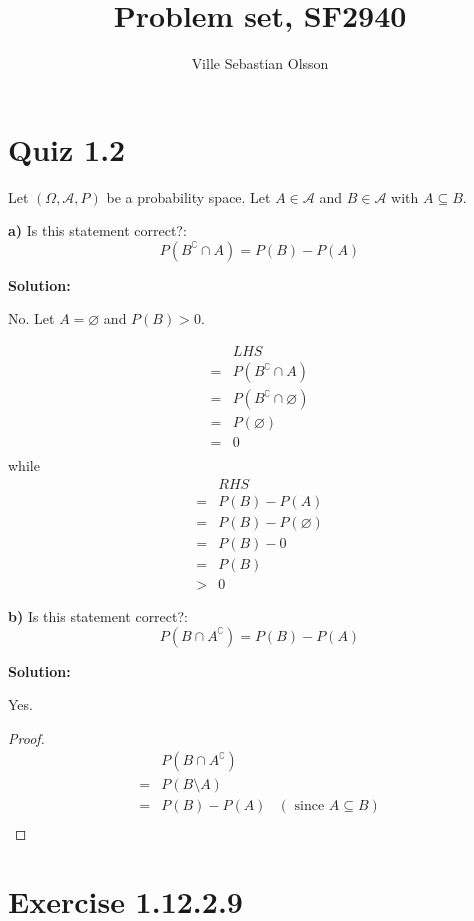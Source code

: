 \documentclass{article}
\title{Problem set, SF2940}
\author{Ville Sebastian Olsson}
\begin{document}
\maketitle

\section{Quiz 1.2}

Let \((\Omega, \mathcal{A}, P)\) be a probability space.
Let \(A\in \mathcal{A}\) and \(B\in \mathcal{A}\)
with \(A\subseteq B\).

\textbf{a)} Is this statement correct?:
\[P(B^\complement \cap A) = P(B)-P(A)\]

\textbf{Solution:}

No. Let \(A=\varnothing\) and \(P(B)>0\).

\begin{align*}
	 & LHS \\
	=& P(B^\complement \cap A) \\
	=& P(B^\complement \cap \varnothing) \\
	=& P(\varnothing) \\
	=& 0 \\
\end{align*}
while
\begin{align*}
	  & RHS \\
	 =& P(B)-P(A) \\
	 =& P(B)-P(\varnothing) \\
	 =& P(B)-0 \\
	 =& P(B) \\
	 >& 0
\end{align*}

\textbf{b)} Is this statement correct?:
\[P(B \cap A^\complement) = P(B)-P(A)\]

\textbf{Solution:}

Yes.
\begin{proof}
\begin{align*}
	 & P(B\cap A^\complement) \\
	=& P(B\setminus A) \\
	=& P(B)-P(A) & (\text{ since }A\subseteq B) \\
\end{align*}
\end{proof}

\section{Exercise 1.12.2.9}
\end{document}
